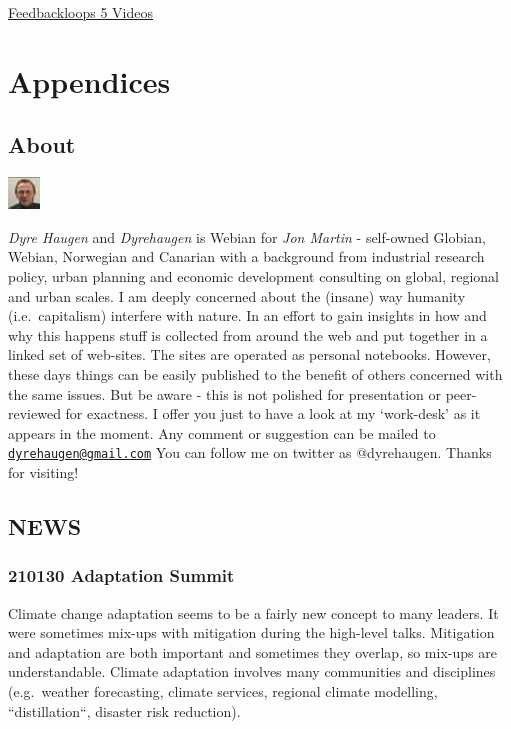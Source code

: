 \documentclass[
]{book}
\begin{document}
\href{https://feedbackloopsclimate.com/introduction/}{Feedbackloops 5 Videos}

\hypertarget{part-appendices}{%
\part{Appendices}\label{part-appendices}}

\hypertarget{appendix-appendices}{%
\appendix}


\hypertarget{about}{%
\chapter{About}\label{about}}

\includegraphics{fig/me.jpg}

\emph{Dyre Haugen} and \emph{Dyrehaugen} is Webian for \emph{Jon Martin} -
self-owned Globian, Webian, Norwegian and Canarian with
a background from industrial research policy, urban planning and
economic development consulting on global, regional and urban scales.
I am deeply concerned about the (insane) way
humanity (i.e.~capitalism) interfere with nature.
In an effort to gain insights in how and why this happens
stuff is collected from around the web and put together
in a linked set of web-sites.
The sites are operated as personal notebooks.
However, these days things can be easily published to the
benefit of others concerned with the same issues.
But be aware - this is not polished for presentation or
peer-reviewed for exactness.
I offer you just to have a look at my `work-desk' as it appears in the moment.
Any comment or suggestion can be mailed to \href{mailto:dyrehaugen@gmail.com}{\nolinkurl{dyrehaugen@gmail.com}}
You can follow me on twitter as @dyrehaugen.
Thanks for visiting!

\hypertarget{news}{%
\chapter{NEWS}\label{news}}

\hypertarget{adaptation-summit}{%
\section{210130 Adaptation Summit}\label{adaptation-summit}}

Climate change adaptation seems to be a fairly new concept to many leaders. It were sometimes mix-ups with mitigation during the high-level talks.
Mitigation and adaptation are both important and sometimes they overlap, so mix-ups are understandable.
Climate adaptation involves many communities and disciplines (e.g.~weather forecasting, climate services, regional climate modelling, ``distillation``, disaster risk reduction).
\end{document}
